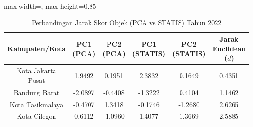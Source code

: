 \begin{table}[H]
\centering
\caption{Perbandingan Jarak Skor Objek (PCA vs STATIS) Tahun 2022} \label{tab:samplejarak_skor_2022}
\begin{adjustbox}{max width=\textwidth, max height=0.85\textheight}
\begin{tabular}{|c|c|c|c|c|c|}
\hline
\textbf{Kabupaten/Kota} & \textbf{PC1 (PCA)} & \textbf{PC2 (PCA)} & \textbf{PC1 (STATIS)} & \textbf{PC2 (STATIS)} & \textbf{Jarak Euclidean ($d$)} \\
\hline
Kota Jakarta Pusat & 1.9492 & 0.1951 & 2.3832 & 0.1649 & 0.4351 \\
Bandung Barat & -2.0897 & -0.4408 & -1.3222 & 0.4104 & 1.1462 \\
Kota Tasikmalaya & -0.4707 & 1.3418 & -0.1746 & -1.2680 & 2.6265 \\
Kota Cilegon & 0.6112 & -1.0960 & 1.4077 & 1.3669 & 2.5885 \\
\hline
\end{tabular}
\end{adjustbox}
\end{table}